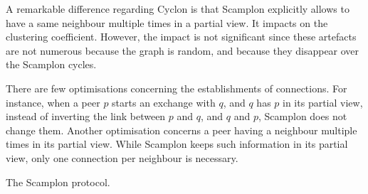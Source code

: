 A remarkable difference regarding Cyclon is that Scamplon explicitly allows to
have a same neighbour multiple times in a partial view. It impacts on the
clustering coefficient. However, the impact is not significant since these
artefacts are not numerous because the graph is random, and because they
disappear over the Scamplon cycles.

There are few optimisations concerning the establishments of connections. For
instance, when a peer $p$ starts an exchange with $q$, and $q$ has $p$ in its
partial view, instead of inverting the link between $p$ and $q$, and $q$ and
$p$, Scamplon does not change them. Another optimisation concerns a peer having
a neighbour multiple times in its partial view. While Scamplon keeps such
information in its partial view, only one connection per neighbour is
necessary.

\begin{algorithm}
  
  \caption{\label{algo:scamplon}The Scamplon protocol.}
\end{algorithm}

